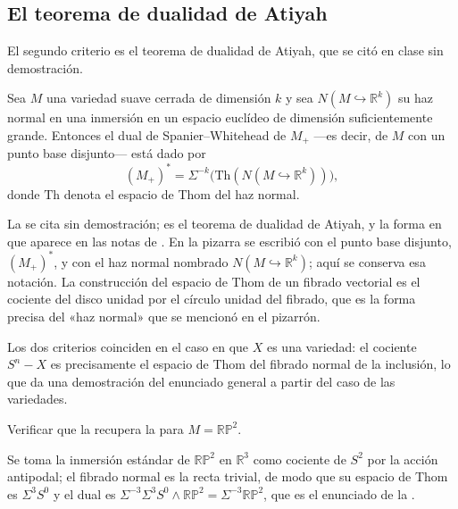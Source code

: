 \subsection{El teorema de dualidad de Atiyah}

El segundo criterio es el teorema de dualidad de Atiyah, que se citó en clase sin demostración.

\begin{teo}\label{teo:atiyah}
Sea $M$ una variedad suave cerrada de dimensión $k$ y sea $N(M\hookrightarrow\mathbb{R}^k)$ su haz normal en una inmersión en un espacio euclídeo de dimensión suficientemente grande. Entonces el dual de Spanier--Whitehead de $M_+$ ---es decir, de $M$ con un punto base disjunto--- está dado por
\[
(M_+)^*=\Sigma^{-k}\bigl(\mathrm{Th}(N(M\hookrightarrow\mathbb{R}^k))\bigr),
\]
donde $\mathrm{Th}$ denota el espacio de Thom del haz normal.
\end{teo}

\begin{nota}
   La  se cita sin demostración; es el teorema de dualidad de Atiyah, y la forma en que aparece en las notas de \textcite{malkiewich}. En la pizarra se escribió con el punto base disjunto, $(M_+)^*$, y con el haz normal nombrado $N(M\hookrightarrow\mathbb{R}^k)$; aquí se conserva esa notación. La construcción del espacio de Thom de un fibrado vectorial es el cociente del disco unidad por el círculo unidad del fibrado, que es la forma precisa del «haz normal» que se mencionó en el pizarrón.

   Los dos criterios coinciden en el caso en que $X$ es una variedad: el cociente $S^n-X$ es precisamente el espacio de Thom del fibrado normal de la inclusión, lo que da una demostración del enunciado general a partir del caso de las variedades.
\end{nota}

\begin{ejer}
Verificar que la  recupera la  para $M=\mathbb{RP}^2$.
\end{ejer}

\begin{sol}
Se toma la inmersión estándar de $\mathbb{RP}^2$ en $\mathbb{R}^3$ como cociente de $S^2$ por la acción antipodal; el fibrado normal es la recta trivial, de modo que su espacio de Thom es $\Sigma^3S^0$ y el dual es $\Sigma^{-3}\Sigma^3S^0\wedge\mathbb{RP}^2=\Sigma^{-3}\mathbb{RP}^2$, que es el enunciado de la .
\end{sol}

